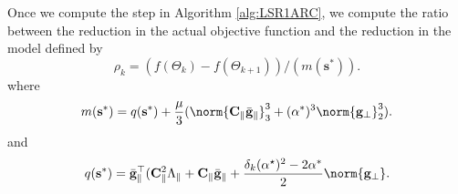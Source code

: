 %
Once we compute the step in Algorithm \ref{alg:LSR1ARC}, we compute the ratio between the reduction in the actual objective function and the reduction in the model  defined by
		\begin{equation}\label{eq:ratio}
		\rho_k = (f(\Theta_k) - f(\Theta_{k+1}))/(m(\mathbf{s}^*)).
		\end{equation}
where
\begin{equation*}
m(\mathbf{s}^*) = q(\mathbf{s}^*) + \frac{\mu}{3} (\norm{\mathbf{C}_\parallel \bar{\mathbf{g}}_{\parallel}}_3^3 + (\alpha^*)^3\norm{\mathbf{g}_{\perp}}_2^3).
\end{equation*}
and
$$q(\mathbf{s}^*) = \bar{\mathbf{g}}_\parallel^{\top}(\mathbf{C}_{\parallel}^2 \Lambda_{\parallel} + \mathbf{C}_{\parallel}\bar{\mathbf{g}}_{\parallel} + \frac{\delta_k(\alpha^{\star})^2 - 2\alpha^*}{2} \norm{\mathbf{g}_{\perp}}.
$$

